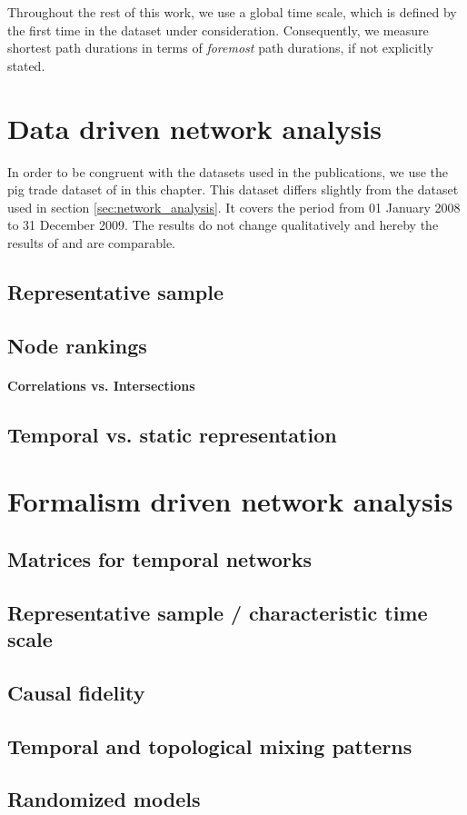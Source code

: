 Throughout the rest of this work, we use a global time scale, which is defined by the first time in the dataset under consideration.
Consequently, we measure shortest path durations in terms of \emph{foremost} path durations, if not explicitly stated.

\section{Data driven network analysis}\label{sec:Plos}
In order to be congruent with the datasets used in the publications, we use the pig trade dataset of \citep{Konschake:2013js} in this chapter.
This dataset differs slightly from the dataset used in section \ref{sec:network_analysis}.
It covers the period from 01 January 2008 to 31 December 2009.
The results do not change qualitatively and hereby the results of \citep{Konschake:2013js} and \citep{Lentz:2013PRL} are comparable.


\subsection{Representative sample}

\subsection{Node rankings}

\paragraph{Correlations vs. Intersections\color{Cayenne}{.}}

\subsection{Temporal vs. static representation}

\section{Formalism driven network analysis}\label{sec:PRL}

\subsection{Matrices for temporal networks}

\subsection{Representative sample / characteristic time scale}

\subsection{Causal fidelity}

\subsection{Temporal and topological mixing patterns}

\subsection{Randomized models}\label{sec:randomized_models_tvg}







